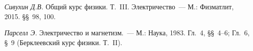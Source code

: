 \begin{lab:literature}

\item{ \emph{Сивухин Д.В.} Общий курс физики. Т.~III. Электричество~--- М.:
Физматлит, 2015. \S\S~98, 100.}

\item{ \emph{Парселл Э.} Электричество и магнетизм.~--- М.: Наука, 1983. Гл.~4,
\S\S~4--6; Гл.~6, \S~9 (Берклеевский курс физики. Т.~II).}

\end{lab:literature}


